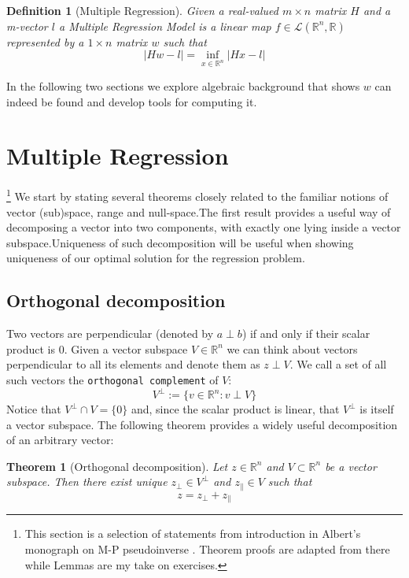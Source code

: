 \documentclass[a4paper,11pt]{article}
\theoremstyle{break}
\newtheorem{theorem}{Theorem}[section]
\newtheorem{definition}{Definition}[section]
\newcommand{\R}{\mathbb{R}}
\newcommand{\pll}{\parallel}
\begin{document}
\begin{definition}[Multiple Regression]
    Given a real-valued $ m \times n$ matrix $H$ and a m-vector $l$ a Multiple Regression Model is a linear map $f \in \mathcal{L} ( \R ^n, \R)$ represented by a $ 1 \times n$ matrix $w$ such that
    \begin{equation}\label{def2}
        | H w - l | = \inf\limits_{x \in \R^n} | H x - l |
    \end{equation}
\end{definition}

In the following two sections we explore algebraic background that shows $ w $ can indeed be found and develop tools for computing it.

\pagebreak
\section{Multiple Regression}

\footnote{This section is a selection of statements from introduction in Albert's monograph on M-P pseudoinverse \cite[pp6-12]{albert}. Theorem proofs are adapted from there while Lemmas are my take on exercises.}
%
We start by stating several theorems closely related to the familiar notions of vector (sub)space, range and null-space.The first result provides a useful way of decomposing a vector into two components, with exactly one lying inside a vector subspace.Uniqueness of such decomposition will be useful when showing uniqueness of our optimal solution for the regression problem.

\subsection{Orthogonal decomposition}
Two vectors are perpendicular (denoted by $ a \perp b$) if and only if their scalar product is 0. Given a vector subspace $V \in \R^n$ we can think about vectors perpendicular to all its elements and denote them as $z \perp V$. We call a set of all such vectors the \texttt{orthogonal complement} of $V$:
$$ V^\perp := \{ v \in \R^n : v \perp V\} $$
Notice that $V^\perp \cap V = \{0\}$ and, since the scalar product is linear, that $V^\perp$ is itself a vector subspace. The following theorem provides a widely useful decomposition of an arbitrary vector:

\begin{theorem}[Orthogonal decomposition] \label{thm:projection}
    Let $z \in \R^n$ and $V \subset \R^n$ be a vector subspace. Then
    there exist unique $z_\perp \in V^\perp$ and $z_\pll \in V$ such that  
    \begin{equation}
        z = z_\perp + z_\pll
    \end{equation}
\end{theorem}
\end{document}
